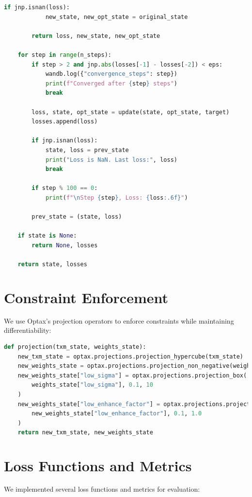 \documentclass[nomenclature, english, bibtex]{kththesis}
\numberwithin{listing}{chapter}
\begin{document}
\begin{lstlisting}[language=Python, caption=Base optimization function]
        if jnp.isnan(loss):
            new_state, new_opt_state = original_state

        return loss, new_state, new_opt_state

    for step in range(n_steps):
        if step > 2 and jnp.abs(losses[-1] - losses[-2]) < eps:
            wandb.log({"convergence_steps": step})
            print(f"Converged after {step} steps")
            break

        loss, state, opt_state = update(state, opt_state, target)
        losses.append(loss)

        if jnp.isnan(loss):
            state, loss = prev_state
            print("Loss is NaN. Last loss:", loss)
            break

        if step % 100 == 0:
            print(f"\nStep {step}, Loss: {loss:.6f}")

        prev_state = (state, loss)

    if state is None:
        return None, losses

    return state, losses
\end{lstlisting}

\section{Constraint Enforcement}
We use Optax's projection operators to enforce constraints while maintaining differentiability:

\begin{lstlisting}[language=Python, caption=Projection function for constraint enforcement]
def projection(txm_state, weights_state):
    new_txm_state = optax.projections.projection_hypercube(txm_state)
    new_weights_state = optax.projections.projection_non_negative(weights_state)
    new_weights_state["low_sigma"] = optax.projections.projection_box(
        weights_state["low_sigma"], 0.1, 10
    )
    new_weights_state["low_enhance_factor"] = optax.projections.projection_box(
        new_weights_state["low_enhance_factor"], 0.1, 1.0
    )
    return new_txm_state, new_weights_state
\end{lstlisting}

\section{Loss Functions and Metrics}
We implemented several loss functions and metrics for evaluation:
\end{document}
